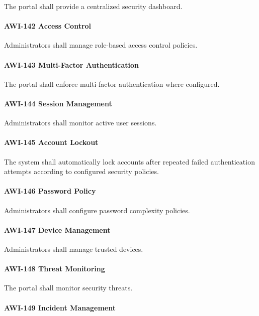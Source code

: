 The portal shall provide a centralized security dashboard.

\paragraph{AWI-142 Access Control}

Administrators shall manage role-based access control policies.

\paragraph{AWI-143 Multi-Factor Authentication}

The portal shall enforce multi-factor authentication where configured.

\paragraph{AWI-144 Session Management}

Administrators shall monitor active user sessions.

\paragraph{AWI-145 Account Lockout}

The system shall automatically lock accounts after repeated failed
authentication attempts according to configured security policies.

\paragraph{AWI-146 Password Policy}

Administrators shall configure password complexity policies.

\paragraph{AWI-147 Device Management}

Administrators shall manage trusted devices.

\paragraph{AWI-148 Threat Monitoring}

The portal shall monitor security threats.

\paragraph{AWI-149 Incident Management}


